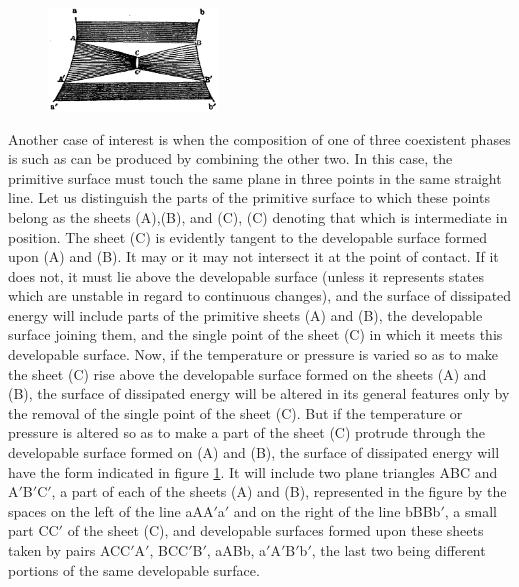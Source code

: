 \documentclass[12pt]{memoir}
\begin{document}
\begin{figure} %
    \centering
    \includegraphics[width=0.4\textwidth]{fig_8}
    \caption{ }
    \label{fig_8}
\end{figure}
Another case of interest is when the composition of one of three coexistent phases is such as can be produced by combining the other two. In this case, the primitive surface must touch the same plane in three points in the same straight line. Let us distinguish the parts of the primitive surface to which these points belong as the sheets (A),(B), and (C), (C) denoting that which is intermediate in position. The sheet (C) is evidently tangent to the developable surface formed upon (A) and (B). It may or it may not intersect it at the point of contact. If it does not, it must lie above the developable surface (unless it represents states which are unstable in regard to continuous changes), and the surface of dissipated energy will include parts of the primitive sheets (A) and (B), the developable surface joining them, and the single point of the sheet (C) in which it meets this developable surface. Now, if the temperature or pressure is varied so as to make the sheet (C) rise above the developable   surface formed on the sheets (A) and (B), the surface of dissipated energy will be altered in its general features only by the removal of the single point of the sheet (C). But if the temperature or pressure
is altered so as to make a part of the sheet (C) protrude through the developable surface formed on (A) and (B), the surface of dissipated energy will have the form indicated in figure \ref{fig_8}. It will include two plane triangles ABC and A$'$B$'$C$'$, a part of each of the sheets (A) and (B), represented in the figure by the spaces on the left of the line aAA$'$a$'$ and on the right of the line bBBb$'$, a small part CC$'$ of the sheet (C), and developable surfaces formed upon these sheets taken by pairs ACC$'$A$'$, BCC$'$B$'$, aABb, a$'$A$'$B$'$b$'$, the last two being different portions of the same developable surface.
\end{document}
